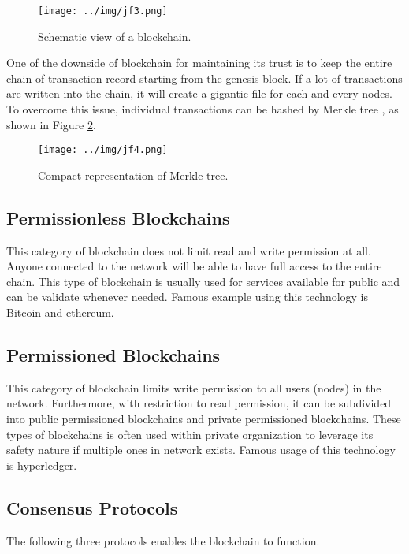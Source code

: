 \documentclass[12pt]{report}
\begin{document}
\begin{figure}[H]
	\centering
	\texttt{[image: ../img/jf3.png]}
	\caption{Schematic view of a blockchain. \cite{8274922}}
	\label{fig:jf3}
\end{figure}

One of the downside of blockchain for maintaining its trust is to keep the entire chain of transaction record starting from the genesis block. If a lot of transactions are written into the chain, it will create a gigantic file for each and every nodes. To overcome this issue, individual transactions can be hashed by Merkle tree \cite{6233691} \cite{Bayer1993ImprovingTE}, as shown in Figure \ref{fig:jf4}.

\begin{figure}[H]
	\centering
	\texttt{[image: ../img/jf4.png]}
	\caption{Compact representation of Merkle tree. \cite{8274922}}
	\label{fig:jf4}
\end{figure}

\subsection{Permissionless Blockchains}

This category of blockchain does not limit read and write permission at all. Anyone connected to the network will be able to have full access to the entire chain. This type of blockchain is usually used for services available for public and can be validate whenever needed. Famous example using this technology is Bitcoin and ethereum.

\subsection{Permissioned Blockchains}

This category of blockchain limits write permission to all users (nodes) in the network. Furthermore, with restriction to read permission, it can be subdivided into public permissioned blockchains and private permissioned blockchains. These types of blockchains is often used within private organization to leverage its safety nature if multiple ones in network exists. Famous usage of this technology is hyperledger.

\subsection{Consensus Protocols}

The following three protocols enables the blockchain to function.
\end{document}
